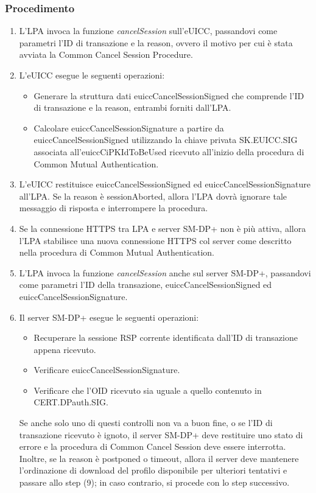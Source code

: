\documentclass[10pt, oneside]{book}
\begin{document}
\subsubsection{Procedimento}
\begin{enumerate}
\item L'LPA invoca la funzione \textit{cancelSession} sull'eUICC, passandovi come parametri l'ID di transazione e la reason, ovvero il motivo per cui è stata avviata la Common Cancel Session Procedure.
\item L'eUICC esegue le seguenti operazioni:
\begin{itemize}[itemsep=0pt]
\item Generare la struttura dati euiccCancelSessionSigned che comprende l'ID di transazione e la reason, entrambi forniti dall'LPA.
\item Calcolare euiccCancelSessionSignature a partire da euiccCancelSessionSigned utilizzando la chiave privata SK.EUICC.SIG associata all'euiccCiPKIdToBeUsed ricevuto all'inizio della procedura di Common Mutual Authentication.
\end{itemize}
\item L'eUICC restituisce euiccCancelSessionSigned ed euiccCancelSessionSignature all'LPA. Se la reason è sessionAborted, allora l'LPA dovrà ignorare tale messaggio di risposta e interrompere la procedura.
\item Se la connessione HTTPS tra LPA e server SM-DP+ non è più attiva, allora l'LPA stabilisce una nuova connessione HTTPS col server come descritto nella procedura di Common Mutual Authentication.
\item L'LPA invoca la funzione \textit{cancelSession} anche sul server SM-DP+, passandovi come parametri l'ID della transazione, euiccCancelSessionSigned ed euiccCancelSessionSignature.
\item Il server SM-DP+ esegue le seguenti operazioni:
\begin{itemize}[itemsep=0pt]
\item Recuperare la sessione RSP corrente identificata dall'ID di transazione appena ricevuto.
\item Verificare euiccCancelSessionSignature.
\item Verificare che l'OID ricevuto sia uguale a quello contenuto in CERT.DPauth.SIG.
\end{itemize}
Se anche solo uno di questi controlli non va a buon fine, o se l'ID di transazione ricevuto è ignoto, il server SM-DP+ deve restituire uno stato di errore e la procedura di Common Cancel Session deve essere interrotta. Inoltre, se la reason è postponed o timeout, allora il server deve mantenere l'ordinazione di download del profilo disponibile per ulteriori tentativi e passare allo step (9); in caso contrario, si procede con lo step successivo.

\end{enumerate}
\end{document}
